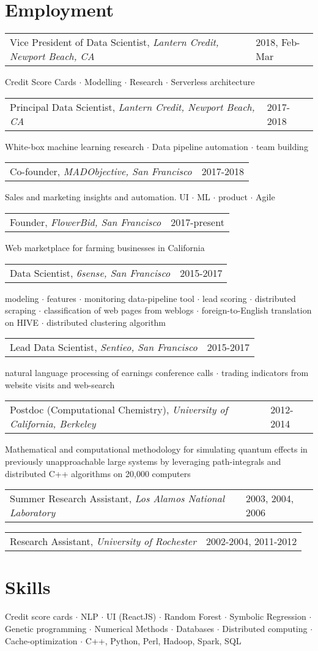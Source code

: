\documentclass{res}
\makeatletter
\newcommand{\af}[3]{
\begin{tabular*}{\textwidth}[t]{@{}p{5.2in} l} 
    #1, \textit{#2} & #3\\
  \end{tabular*}
}
\newcommand{\aff}[4]{
\begin{tabular*}{\textwidth}[t]{@{}p{5.2in} l} 
    #1, \textit{#2} & #3\\
  \end{tabular*}
  {\color[RGB]{106,106,106} #4}\\
}
\makeatother
\begin{document}
 


\address{
  1632 Walnut St.\\
  Berkeley, CA 94709 \\
}
\address{
  (585) 313-6024\\
  kirill.igum@gmail.com\\
  \url{www.linkedin.com/in/kirilligum}
}

\begin{resume}

\section{Employment}
\aff{Vice President of Data Scientist}{Lantern Credit, Newport Beach, CA}{2018, Feb-Mar}{ 
	Credit Score Cards $\cdot$ Modelling $\cdot$ Research $\cdot$ Serverless architecture
} 
\aff{Principal Data Scientist}{Lantern Credit, Newport Beach, CA}{2017-2018}{ 
	White-box machine learning research $\cdot$ Data pipeline automation $\cdot$ team building
} 
\aff{Co-founder}{MADObjective, San Francisco}{2017-2018}{ 
	Sales and marketing insights and automation. UI $\cdot$ ML $\cdot$ product $\cdot$ Agile
} 
\aff{Founder}{FlowerBid, San Francisco}{2017-present}{ 
	Web marketplace for farming businesses in California
} 
\aff{Data Scientist}{6sense, San Francisco}{2015-2017}{ 
	modeling $\cdot$ 
	features $\cdot$  
	monitoring data-pipeline tool $\cdot$ 
	lead scoring $\cdot$
	distributed scraping $\cdot$
	classification of web pages from weblogs $\cdot$
	foreign-to-English translation on HIVE $\cdot$
	distributed clustering algorithm
} 
\aff{Lead Data Scientist}{Sentieo, San Francisco}{2015-2017}{ 
	natural language processing of earnings conference calls $\cdot$ trading indicators from website visits and web-search
} 
\aff{Postdoc (Computational Chemistry)}{University of California, Berkeley}{2012-2014}{ 
  Mathematical and computational methodology for simulating quantum effects in previously unapproachable large systems by leveraging path-integrals and distributed C++ algorithms on 20,000 computers
} 
\af{Summer Research Assistant}{Los Alamos National Laboratory}{2003, 2004, 2006}
\af{Research Assistant}{University of Rochester}{2002-2004, 2011-2012}
 
\section{Skills}
	Credit score cards $\cdot$
	NLP $\cdot$
	UI (ReactJS) $\cdot$
	Random Forest $\cdot$
	Symbolic Regression $\cdot$
	Genetic programming $\cdot$
	Numerical Methods $\cdot$
	Databases $\cdot$
	Distributed computing $\cdot$
	Cache-optimization $\cdot$
	C++, Python, Perl, Hadoop, Spark, SQL


\end{resume}
\end{document}
